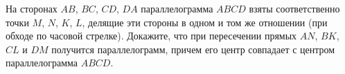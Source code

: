 \begin{ex}
	\begin{condition}
		На сторонах \( AB \), \( BC \), \( CD \), \( DA  \) параллелограмма \( 	ABCD  \) взяты соответственно точки \( M  \), \( N  \), \( K \), \( L \), делящие эти стороны в одном и том же отношении (при обходе по часовой	стрелке). Докажите, что при пересечении прямых \( AN  \), \( BK \), \( CL \) и \( DM  \) получится параллелограмм, причем его центр совпадает с центром параллелограмма \( ABCD \).
	\end{condition}
\end{ex}